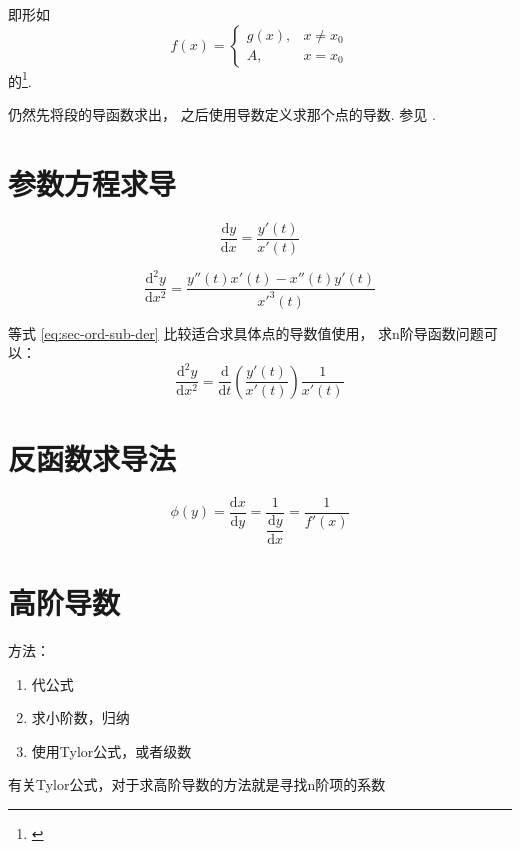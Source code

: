 即形如
\[
    f(x) = 
    \left\{
        \begin{array}{rl}
            g(x),&x \neq x_0 \\
            A, &x = x_0
        \end{array}
    \right. 
\]
的\footnote{\cite[page 16]{w660ans}}.

仍然先将段的导函数求出，
之后使用导数定义求那个点的导数.
参见 \cite[quest27]{w660}.

\section{参数方程求导}

\begin{lemma}
    \begin{equation}
        \dfrac{\mbox{d}y}{\mbox{d}x} = \dfrac{y'(t)}{x'(t)}
    \end{equation}

    \begin{equation}\label{eq:sec-ord-sub-der}
        \dfrac{\mbox{d}^2 y}{\mbox{d}x^2} = \dfrac{y''(t) x'(t) -x''(t) y'(t)}{x'^3(t)}
    \end{equation}

    等式 \ref{eq:sec-ord-sub-der} 比较适合求具体点的导数值使用，
    求n阶导函数问题可以：
    \begin{equation}
        \dfrac{\mbox{d}^2y}{\mbox{d}x^2} = 
        \dfrac{\mbox{d}}{\mbox{d}t} 
        \left(
            \dfrac{y'(t)}{x'(t)} 
        \right)
        \dfrac{1}{x'(t)}
    \end{equation}
\end{lemma}

\section{反函数求导法}

\begin{lemma}
    \begin{equation}
        \phi (y) = \dfrac{\mbox{d}x}{\mbox{d}y} = \dfrac{1}{\dfrac{\mbox{d}y}{\mbox{d}x}}
                   = \dfrac{1}{f'(x)}
    \end{equation}
\end{lemma}

\section{高阶导数}

方法：
\begin{enumerate}
    \item 代公式
    \item 求小阶数，归纳
    \item 使用Tylor公式，或者级数
\end{enumerate}
有关Tylor公式，对于求高阶导数的方法就是寻找n阶项的系数

